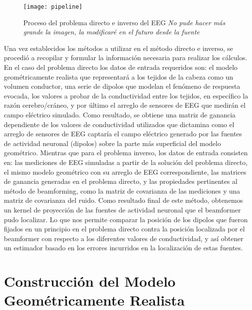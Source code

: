 \begin{figure}[t]
	\centering
	\texttt{[image: pipeline]}
	\caption{Proceso del problema directo e inverso del EEG \emph{No pude hacer más grande la imagen, la modificaré en el futuro desde la fuente}}
	\label{fig:methodology:pipeline}
\end{figure}


Una vez establecidos los métodos a utilizar en el método directo e inverso, se procedió a recopilar y formular la información necesaria para realizar los cálculos. En el caso del problema directo los datos de entrada requeridos son: el modelo geométricamente realista que representará a los tejidos de la cabeza como un volumen conductor, una serie de dipolos que modelan el fenómeno de respuesta evocada, los valores a probar de la conductividad entre los tejidos, en específico la razón cerebro/cráneo, y por último el arreglo de sensores de EEG que medirán el campo eléctrico simulado. Como resultado, se obtiene una matriz de ganancia dependiente de los valores de conductividad utilizados que dictamina como el arreglo de sensores de EEG captaría el campo eléctrico generado por las fuentes de actividad neuronal (dipolos) sobre la parte más superficial del modelo geométrico. Mientras que para el problema inverso, los datos de entrada consisten en: las mediciones de EEG simuladas a partir de la solución del problema directo, el mismo modelo geométrico con su arreglo de EEG correspondiente, las matrices de ganancia generadas en el problema directo, y las propiedades pertinentes al método de beamforming, como la matriz de covarianza de las mediciones y una matriz de covarianza del ruido. Como resultado final de este método, obtenemos un kernel de proyección de las fuentes de actividad neuronal que el beamformer pudo localizar. Lo que nos permite comparar la posición de los dipolos que fueron fijados en un principio en el problema directo contra la posición localizada por el beamformer con respecto a los diferentes valores de conductividad, y así obtener un estimador basado en los errores incurridos en la localización de estas fuentes. 


\section{Construcción del Modelo Geométricamente Realista}
\label{sec:methodology:model}


